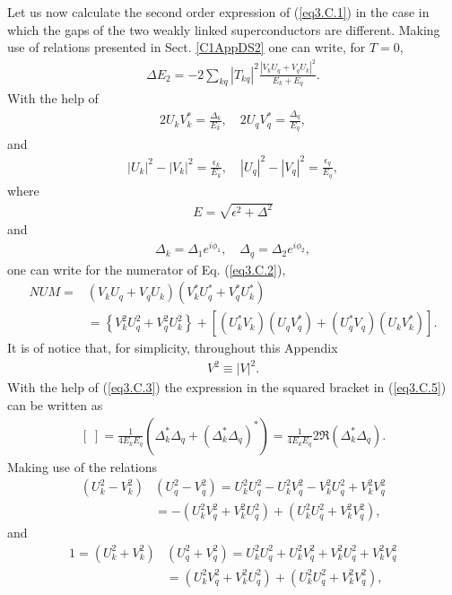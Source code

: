 Let us now calculate the second order expression of  (\ref{eq3.C.1}) in the case in which the gaps of the two weakly linked superconductors are different.
Making use of  relations presented in Sect. \ref{C1AppDS2} one can write, for $T=0$,
\begin{align}\label{eq3.C.2}
\Delta E_2=-2\sum_{kq}|T_{kq}|^2\frac{|V_kU_q+V_qU_k|^2}{E_k+E_q}.
\end{align}
With the help of 
\begin{align}\label{eq3.C.3}
2U_kV_k^*=\frac{\Delta_k}{E_k},\quad 2U_qV_q^*=\frac{\Delta_q}{E_q},
\end{align}
and
\begin{align}
|U_k|^2-|V_k|^2=\frac{\epsilon_k}{E_k},\quad |U_q|^2-|V_q|^2=\frac{\epsilon_q}{E_q},
\end{align}
where
\begin{align}
E=\sqrt{\epsilon^2+\Delta^2}
\end{align}
and 
\begin{align}\label{eq3.C.6}
\Delta_k=\Delta_1e^{i\phi_1},\quad \Delta_q=\Delta_2e^{i\phi_2},
\end{align}
one can write for the numerator of Eq. (\ref{eq3.C.2}),
\begin{align}\label{eq3.C.5}
\nonumber NUM=&\left(V_kU_q+V_qU_k\right)\left(V^*_kU^*_q+V^*_qU^*_k\right)\\
&=\left\{V^2_kU^2_q+V^2_qU^2_k\right\}+\left[(U_k^*V_k)(U_qV^*_q)+(U_q^*V_q)(U_kV^*_k)\right].
\end{align}
It is of notice that, for simplicity, throughout this Appendix
\begin{align}
V^2\equiv|V|^2.
\end{align}
With the help of (\ref{eq3.C.3}) the expression in the squared bracket in (\ref{eq3.C.5}) can be written as 
\begin{align}\label{eq3.C.9}
[\;]=\frac{1}{4E_kE_q}\left(\Delta_k^*\Delta_q+(\Delta_k^*\Delta_q)^*\right)=\frac{1}{4E_kE_q}2\Re(\Delta_k^*\Delta_q).
\end{align}
Making use of the relations
\begin{align}
\nonumber \left(U_k^2-V_k^2\right)&\left(U_q^2-V_q^2\right)=U_k^2U_q^2-U_k^2V_q^2-V_k^2U_q^2+V_k^2V_q^2\\
&=-\left(U_k^2V_q^2+V_k^2U_q^2\right)+\left(U_k^2U_q^2+V_k^2V_q^2\right),
\end{align}
and
\begin{align}
\nonumber 1=\left(U_k^2+V_k^2\right)&\left(U_q^2+V_q^2\right)=U_k^2U_q^2+U_k^2V_q^2+V_k^2U_q^2+V_k^2V_q^2\\
&=\left(U_k^2V_q^2+V_k^2U_q^2\right)+\left(U_k^2U_q^2+V_k^2V_q^2\right),
\end{align}
